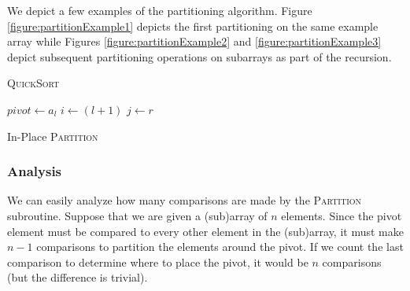We depict a few examples of the partitioning algorithm.  Figure 
\ref{figure:partitionExample1} depicts the first partitioning on the
same example array while Figures \ref{figure:partitionExample2} and
\ref{figure:partitionExample3} depict subsequent partitioning operations
on subarrays as part of the recursion.

\begin{algorithm}[H]
\caption{\textsc{QuickSort}}
\label{algo:quickSort}
\end{algorithm}

\begin{algorithm}[H]
  $pivot \leftarrow a_l$ \; 
  $i \leftarrow (l+1)$ \;
  $j \leftarrow r$ \;
\caption{In-Place \textsc{Partition}}
\label{algo:partition}
\end{algorithm}





\subsubsection{Analysis}

We can easily analyze how many comparisons are made by the \textsc{Partition}
subroutine.  Suppose that we are given a (sub)array of $n$ elements.  Since 
the pivot element must be compared to every other element in the (sub)array, 
it must make $n-1$ comparisons to partition the elements around the pivot.
If we count the last comparison to determine where to place the pivot, it 
would be $n$ comparisons (but the difference is trivial).  

